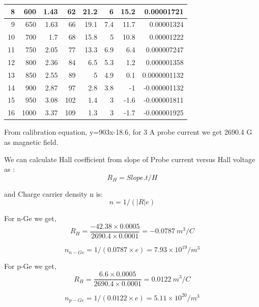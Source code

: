 \documentclass[a4paper, amsfonts, amssymb, amsmath, reprint, showkeys, nofootinbib, twoside]{revtex4-1}
\begin{document}
\begin{table}[H]
{\begin{tabular}{|r|r|r|r|r|r|r|r|}
			8  & 600  & 1.43 & 62  & 21.2 & 6    & 15.2 & 0.00001721  \\ \hline
			9  & 650  & 1.63 & 66  & 19.1 & 7.4  & 11.7 & 0.00001324  \\ \hline
			10 & 700  & 1.7  & 68  & 15.8 & 5    & 10.8 & 0.00001222  \\ \hline
			11 & 750  & 2.05 & 77  & 13.3 & 6.9  & 6.4  & 0.000007247  \\ \hline
			12 & 800  & 2.36 & 84  & 6.5  & 5.3  & 1.2  & 0.000001358  \\ \hline
			13 & 850  & 2.55 & 89  & 5    & 4.9  & 0.1  & 0.0000001132  \\ \hline
			14 & 900  & 2.87 & 97  & 2.8  & 3.8  & -1   & -0.000001132 \\ \hline
			15 & 950  & 3.08 & 102 & 1.4  & 3    & -1.6 & -0.000001811 \\ \hline
			16 & 1000 & 3.37 & 109 & 1.3  & 3    & -1.7 & -0.000001925 \\ \hline
		\end{tabular}%
	}
\end{table}

From calibration equation, y=903x-18.6, for 3 A probe current we get 2690.4 G as magnetic field.

We can calculate Hall coefficient from slope of Probe current versus Hall voltage as :
\begin{equation}
	R_H=Slope.t/H
\end{equation}

and Charge carrier density n is:
\begin{equation}
	n=1/(|R|e)
\end{equation}

For n-Ge we get,
\begin{equation}
	R_H=\frac{-42.38\times0.0005}{2690.4\times0.0001}=-0.0787~m^3/C
\end{equation}

\begin{equation}
	n_{n-Ge}=1/(0.0787\times e)=7.93\times10^{19}  /m^3
\end{equation}

For p-Ge we get,
\begin{equation}
	R_H=\frac{6.6\times0.0005}{2690.4\times0.0001}=0.0122~m^3/C
\end{equation}

\begin{equation}
	n_{p-Ge}=1/(0.0122\times e)=5.11\times10^{20} /m^3
\end{equation}
\end{document}
